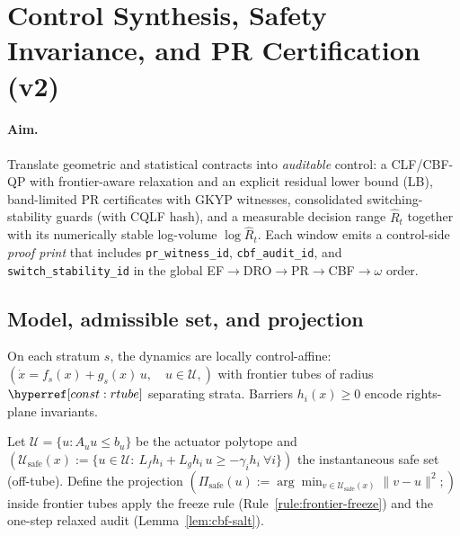 \section{Control Synthesis, Safety Invariance, and PR Certification (v2)}\label{sec:ctrl-v2}

\paragraph{Aim.}
Translate geometric and statistical contracts into \emph{auditable} control: a CLF/CBF-QP with frontier-aware relaxation and an explicit residual lower bound (LB), band-limited PR certificates with GKYP witnesses, consolidated switching-stability guards (with CQLF hash), and a measurable decision range $\hat R_t$ together with its numerically stable log-volume $\log \hat R_t$. Each window emits a control-side \emph{proof print} that includes \texttt{pr\_witness\_id}, \texttt{cbf\_audit\_id}, and \texttt{switch\_stability\_id} in the global EF$\rightarrow$DRO$\rightarrow$PR$\rightarrow$CBF$\rightarrow\omega$ order.

\subsection{Model, admissible set, and projection}\label{subsec:model-proj}
\emph{}

\begin{definition}\label{def:pwa}
On each stratum $s$, the dynamics are locally control-affine:
$(
\dot x = f_s(x) + g_s(x)\,u,\quad u\in\mathcal U,
)$
with frontier tubes of radius $\constref{rtube}$ separating strata. Barriers $h_i(x)\ge 0$ encode rights-plane invariants.
\end{definition}

\begin{definition}\label{def:proj}
Let $\mathcal U=\{u: A_u u\le b_u\}$ be the actuator polytope and
$(
\mathcal U_{\mathrm{safe}}(x):=\{u\in\mathcal U:\ L_f h_i + L_g h_i\,u\ge -\gamma_i h_i\ \forall i\}
)$
the instantaneous safe set (off-tube). Define the projection
$(
\Pi_{\mathrm{safe}}(u):=\arg\min_{v\in \mathcal U_{\mathrm{safe}}(x)}\|v-u\|^2;
)$
inside frontier tubes apply the freeze rule (Rule~\ref{rule:frontier-freeze}) and the one-step relaxed audit (Lemma~\ref{lem:cbf-salt}).
\end{definition}


